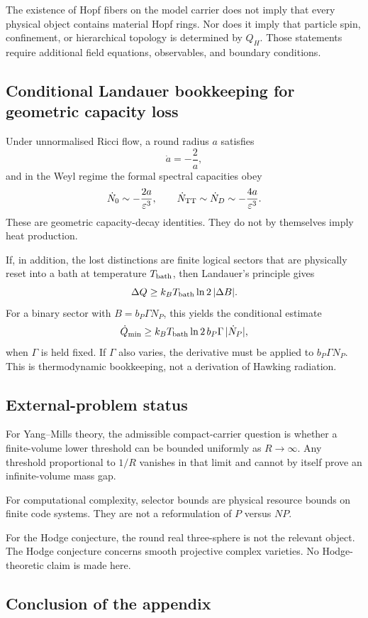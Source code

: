 \documentclass[11pt,a4paper]{article}
\begin{document}
The existence of Hopf fibers on the model carrier does not imply that every physical object contains material Hopf rings.  Nor does it imply that particle spin, confinement, or hierarchical topology is determined by \(Q_H\).  Those statements require additional field equations, observables, and boundary conditions.

\subsection{Conditional Landauer bookkeeping for geometric capacity loss}

Under unnormalised Ricci flow, a round radius \(a\) satisfies
\[
\dot a=-\frac2a,
\]
and in the Weyl regime the formal spectral capacities obey
\[
\dot N_0\sim-\frac{2a}{\varepsilon^3},
\qquad
\dot N_{\rm TT}\sim\dot N_D\sim-\frac{4a}{\varepsilon^3}.
\]
These are geometric capacity-decay identities.  They do not by themselves imply heat production.

If, in addition, the lost distinctions are finite logical sectors that are physically reset into a bath at temperature \(T_{\rm bath}\), then Landauer's principle gives
\[
\Delta Q\ge k_BT_{\rm bath}\ln2\,|\Delta B|.
\]
For a binary sector with \(B=b_P\Gamma N_P\), this yields the conditional estimate
\[
\dot Q_{\min}
\ge
k_BT_{\rm bath}\ln2\,b_P\Gamma\,|\dot N_P|,
\]
when \(\Gamma\) is held fixed.  If \(\Gamma\) also varies, the derivative must be applied to \(b_P\Gamma N_P\).  This is thermodynamic bookkeeping, not a derivation of Hawking radiation.

\subsection{External-problem status}

For Yang--Mills theory, the admissible compact-carrier question is whether a finite-volume lower threshold can be bounded uniformly as \(R\to\infty\).  Any threshold proportional to \(1/R\) vanishes in that limit and cannot by itself prove an infinite-volume mass gap.

For computational complexity, selector bounds are physical resource bounds on finite code systems.  They are not a reformulation of \(P\) versus \(NP\).

For the Hodge conjecture, the round real three-sphere is not the relevant object.  The Hodge conjecture concerns smooth projective complex varieties.  No Hodge-theoretic claim is made here.

\subsection{Conclusion of the appendix}
\end{document}

